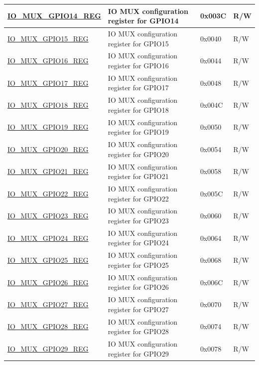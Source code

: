 \begin{longtable}{ | p{6cm} | p{7.2cm} | p{1.3cm} | p{1cm} | }
\hyperref[regdesc:IOMUXGPIONREG]{IO\_MUX\_GPIO14\_REG} & IO MUX configuration register for GPIO14 & 0x003C & R/W \\ \hline
\hyperref[regdesc:IOMUXGPIONREG]{IO\_MUX\_GPIO15\_REG} & IO MUX configuration register for GPIO15 & 0x0040 & R/W \\ \hline
\hyperref[regdesc:IOMUXGPIONREG]{IO\_MUX\_GPIO16\_REG} & IO MUX configuration register for GPIO16 & 0x0044 & R/W \\ \hline
\hyperref[regdesc:IOMUXGPIONREG]{IO\_MUX\_GPIO17\_REG} & IO MUX configuration register for GPIO17 & 0x0048 & R/W \\ \hline
\hyperref[regdesc:IOMUXGPIONREG]{IO\_MUX\_GPIO18\_REG} & IO MUX configuration register for GPIO18 & 0x004C & R/W \\ \hline
\hyperref[regdesc:IOMUXGPIONREG]{IO\_MUX\_GPIO19\_REG} & IO MUX configuration register for GPIO19 & 0x0050 & R/W \\ \hline
\hyperref[regdesc:IOMUXGPIONREG]{IO\_MUX\_GPIO20\_REG} & IO MUX configuration register for GPIO20 & 0x0054 & R/W \\ \hline
\hyperref[regdesc:IOMUXGPIONREG]{IO\_MUX\_GPIO21\_REG} & IO MUX configuration register for GPIO21 & 0x0058 & R/W \\ \hline
\hyperref[regdesc:IOMUXGPIONREG]{IO\_MUX\_GPIO22\_REG} & IO MUX configuration register for GPIO22 & 0x005C & R/W \\ \hline
\hyperref[regdesc:IOMUXGPIONREG]{IO\_MUX\_GPIO23\_REG} & IO MUX configuration register for GPIO23 & 0x0060 & R/W \\ \hline
\hyperref[regdesc:IOMUXGPIONREG]{IO\_MUX\_GPIO24\_REG} & IO MUX configuration register for GPIO24 & 0x0064 & R/W \\ \hline
\hyperref[regdesc:IOMUXGPIONREG]{IO\_MUX\_GPIO25\_REG} & IO MUX configuration register for GPIO25 & 0x0068 & R/W \\ \hline
\hyperref[regdesc:IOMUXGPIONREG]{IO\_MUX\_GPIO26\_REG} & IO MUX configuration register for GPIO26 & 0x006C & R/W \\ \hline
\hyperref[regdesc:IOMUXGPIONREG]{IO\_MUX\_GPIO27\_REG} & IO MUX configuration register for GPIO27 & 0x0070 & R/W \\ \hline
\hyperref[regdesc:IOMUXGPIONREG]{IO\_MUX\_GPIO28\_REG} & IO MUX configuration register for GPIO28 & 0x0074 & R/W \\ \hline
\hyperref[regdesc:IOMUXGPIONREG]{IO\_MUX\_GPIO29\_REG} & IO MUX configuration register for GPIO29 & 0x0078 & R/W \\ \hline

\end{longtable}
